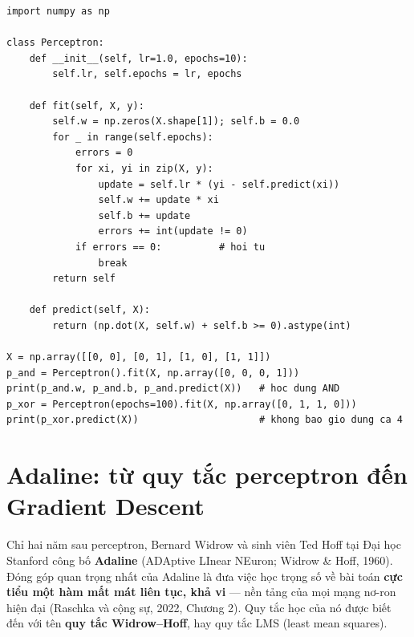 \begin{lstlisting}[caption={Cài đặt perceptron từ đầu}]
import numpy as np

class Perceptron:
    def __init__(self, lr=1.0, epochs=10):
        self.lr, self.epochs = lr, epochs

    def fit(self, X, y):
        self.w = np.zeros(X.shape[1]); self.b = 0.0
        for _ in range(self.epochs):
            errors = 0
            for xi, yi in zip(X, y):
                update = self.lr * (yi - self.predict(xi))
                self.w += update * xi
                self.b += update
                errors += int(update != 0)
            if errors == 0:          # hoi tu
                break
        return self

    def predict(self, X):
        return (np.dot(X, self.w) + self.b >= 0).astype(int)

X = np.array([[0, 0], [0, 1], [1, 0], [1, 1]])
p_and = Perceptron().fit(X, np.array([0, 0, 0, 1]))
print(p_and.w, p_and.b, p_and.predict(X))   # hoc dung AND
p_xor = Perceptron(epochs=100).fit(X, np.array([0, 1, 1, 0]))
print(p_xor.predict(X))                     # khong bao gio dung ca 4
\end{lstlisting}

\section{Adaline: từ quy tắc perceptron đến Gradient Descent}
\label{sec:adaline}

Chỉ hai năm sau perceptron, Bernard Widrow và sinh viên Ted Hoff tại Đại học Stanford công bố \textbf{Adaline} (ADAptive LInear NEuron; Widrow \& Hoff, 1960). Đóng góp quan trọng nhất của Adaline là đưa việc học trọng số về bài toán \textbf{cực tiểu một hàm mất mát liên tục, khả vi} --- nền tảng của mọi mạng nơ-ron hiện đại (Raschka và cộng sự, 2022, Chương 2). Quy tắc học của nó được biết đến với tên \textbf{quy tắc Widrow--Hoff}, hay quy tắc LMS (least mean squares).

